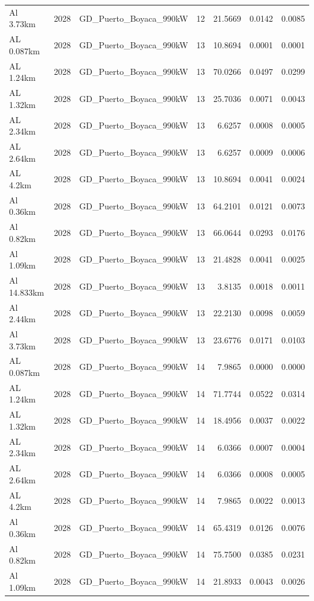 \documentclass[11pt,a4paper]{article}
\begin{document}
\begin{longtable}{llllrrr}
Al 3.73km & 2028 & GD\_Puerto\_Boyaca\_990kW & 12 & 21.5669 & 0.0142 & 0.0085 \\
AL 0.087km & 2028 & GD\_Puerto\_Boyaca\_990kW & 13 & 10.8694 & 0.0001 & 0.0001 \\
AL 1.24km & 2028 & GD\_Puerto\_Boyaca\_990kW & 13 & 70.0266 & 0.0497 & 0.0299 \\
AL 1.32km & 2028 & GD\_Puerto\_Boyaca\_990kW & 13 & 25.7036 & 0.0071 & 0.0043 \\
AL 2.34km & 2028 & GD\_Puerto\_Boyaca\_990kW & 13 & 6.6257 & 0.0008 & 0.0005 \\
AL 2.64km & 2028 & GD\_Puerto\_Boyaca\_990kW & 13 & 6.6257 & 0.0009 & 0.0006 \\
AL 4.2km & 2028 & GD\_Puerto\_Boyaca\_990kW & 13 & 10.8694 & 0.0041 & 0.0024 \\
Al 0.36km & 2028 & GD\_Puerto\_Boyaca\_990kW & 13 & 64.2101 & 0.0121 & 0.0073 \\
Al 0.82km & 2028 & GD\_Puerto\_Boyaca\_990kW & 13 & 66.0644 & 0.0293 & 0.0176 \\
Al 1.09km & 2028 & GD\_Puerto\_Boyaca\_990kW & 13 & 21.4828 & 0.0041 & 0.0025 \\
Al 14.833km & 2028 & GD\_Puerto\_Boyaca\_990kW & 13 & 3.8135 & 0.0018 & 0.0011 \\
Al 2.44km & 2028 & GD\_Puerto\_Boyaca\_990kW & 13 & 22.2130 & 0.0098 & 0.0059 \\
Al 3.73km & 2028 & GD\_Puerto\_Boyaca\_990kW & 13 & 23.6776 & 0.0171 & 0.0103 \\
AL 0.087km & 2028 & GD\_Puerto\_Boyaca\_990kW & 14 & 7.9865 & 0.0000 & 0.0000 \\
AL 1.24km & 2028 & GD\_Puerto\_Boyaca\_990kW & 14 & 71.7744 & 0.0522 & 0.0314 \\
AL 1.32km & 2028 & GD\_Puerto\_Boyaca\_990kW & 14 & 18.4956 & 0.0037 & 0.0022 \\
AL 2.34km & 2028 & GD\_Puerto\_Boyaca\_990kW & 14 & 6.0366 & 0.0007 & 0.0004 \\
AL 2.64km & 2028 & GD\_Puerto\_Boyaca\_990kW & 14 & 6.0366 & 0.0008 & 0.0005 \\
AL 4.2km & 2028 & GD\_Puerto\_Boyaca\_990kW & 14 & 7.9865 & 0.0022 & 0.0013 \\
Al 0.36km & 2028 & GD\_Puerto\_Boyaca\_990kW & 14 & 65.4319 & 0.0126 & 0.0076 \\
Al 0.82km & 2028 & GD\_Puerto\_Boyaca\_990kW & 14 & 75.7500 & 0.0385 & 0.0231 \\
Al 1.09km & 2028 & GD\_Puerto\_Boyaca\_990kW & 14 & 21.8933 & 0.0043 & 0.0026 \\

\end{longtable}
\end{document}
